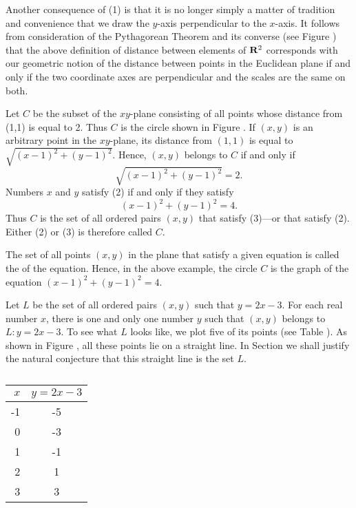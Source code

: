 Another consequence of (1)
is that it is no longer simply a matter of tradition and convenience
that we draw the $y$-axis perpendicular to the $x$-axis.
It follows from consideration of the Pythagorean Theorem
and its converse (see Figure )
that the above definition of distance between elements of $\mathrm{\bf R}^2$
corresponds with our geometric notion of the distance between points
in the Euclidean plane
if and only if the two coordinate axes are perpendicular
and the scales are the same on both.


\begin{example}
\label{exam 1.2.2}
Let $C$ be the subset of the $xy$-plane
consisting of all points whose distance from (1,1) is equal to 2.
Thus $C$ is the circle shown in Figure .
If $(x, y)$ is an arbitrary point in the $xy$-plane,
its distance from $(1,1)$
is equal to
$\sqrt{(x - 1)^2 + (y - 1)^2}$.
Hence, $(x, y)$ belongs to $C$
if and only if
\begin{equation}
\sqrt{(x - 1)^2 + (y - 1)^2} = 2.  
\label{eq1.2.2}
\end{equation}
Numbers $x$ and $y$ satisfy (2)
if and only if they satisfy 
\begin{equation}
(x - 1)^2 + (y - 1)^2 = 4.        
\label{eq1.2.3}
\end{equation}
Thus $C$ is the set of all ordered pairs $(x, y)$
that satisfy (3)---or that satisfy (2).
Either (2) or (3) is therefore called
 $C$.
\end{example}

The set of all points $(x, y)$ in the plane
that satisfy a given equation is called the
 of the equation.
Hence, in the above example,
the circle $C$ is the graph of the equation
$(x - 1)^2 + (y - 1)^2 = 4$.

\begin{example}
\label{exam 1.2.3}
Let $L$ be the set of all ordered pairs $(x, y)$
such that $y = 2x - 3$.
For each real number $x$,
there is one and only one number $y$
such that $(x, y)$ belongs to $L: y = 2x - 3$.
To see what $L$ looks like,
we plot five of its points (see Table ).
As shown in Figure ,
all these points lie on a straight line.
In Section 
we shall justify the natural conjecture
that this straight line is the set $L$.
\end{example}

\begin{table}
\centering
\begin{tabular}{r|c} \hline
$x$  &  $y=2x - 3$     \\ \hline
 -1  &   -5            \\
  0  &   -3            \\
  1  &   -1            \\
  2  &    1            \\
  3  &    3            \\ \hline
\end{tabular}
\caption{}
\label{table 1.1}
\end{table}

